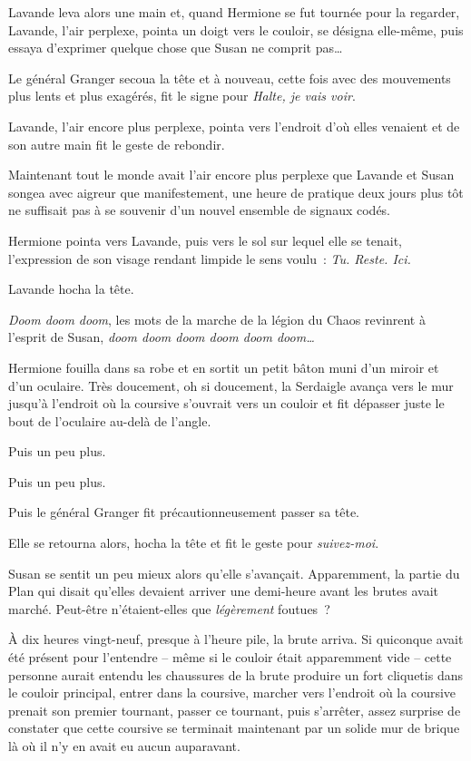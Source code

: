 Lavande leva alors une main et, quand Hermione se fut tournée pour la regarder, Lavande, l'air perplexe, pointa un doigt vers le couloir, se désigna elle-même, puis essaya d'exprimer quelque chose que Susan ne comprit pas…

Le général Granger secoua la tête et à nouveau, cette fois avec des mouvements plus lents et plus exagérés, fit le signe pour \emph{Halte, je vais voir}.

Lavande, l'air encore plus perplexe, pointa vers l'endroit d'où elles venaient et de son autre main fit le geste de rebondir.

Maintenant tout le monde avait l'air encore plus perplexe que Lavande et Susan songea avec aigreur que manifestement, une heure de pratique deux jours plus tôt ne suffisait pas à se souvenir d'un nouvel ensemble de signaux codés.

Hermione pointa vers Lavande, puis vers le sol sur lequel elle se tenait, l'expression de son visage rendant limpide le sens voulu~: \emph{Tu.
Reste. Ici.}

Lavande hocha la tête.

\emph{Doom doom doom}, les mots de la marche de la légion du Chaos revinrent à l'esprit de Susan, \emph{doom doom doom doom doom doom…}\footnotemark{}

Hermione fouilla dans sa robe et en sortit un petit bâton muni d'un miroir et d'un oculaire.
Très doucement, oh si doucement, la Serdaigle avança vers le mur jusqu'à l'endroit où la coursive s'ouvrait vers un couloir et fit dépasser juste le bout de l'oculaire au-delà de l'angle.

Puis un peu plus.

Puis un peu plus.

Puis le général Granger fit précautionneusement passer sa tête.

Elle se retourna alors, hocha la tête et fit le geste pour \emph{suivez-moi}.

Susan se sentit un peu mieux alors qu'elle s'avançait.
Apparemment, la partie du Plan qui disait qu'elles devaient arriver une demi-heure avant les brutes avait marché.
Peut-être n'étaient-elles que \emph{légèrement} foutues~?

\later

À dix heures vingt-neuf, presque à l'heure pile, la brute arriva.
Si quiconque avait été présent pour l'entendre -- même si le couloir était apparemment vide -- cette personne aurait entendu les chaussures de la brute produire un fort cliquetis dans le couloir principal, entrer dans la coursive, marcher vers l'endroit où la coursive prenait son premier tournant, passer ce tournant, puis s'arrêter, assez surprise de constater que cette coursive se terminait maintenant par un solide mur de brique là où il n'y en avait eu aucun auparavant.

